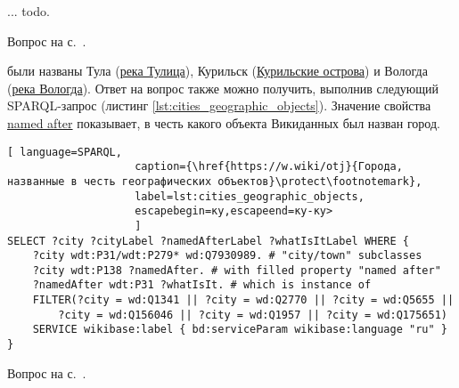 \begin{task}
    \label{answer:global-vars-pros-cons}
     ... todo. 

    \small{Вопрос на с.~\pageref{fig:block:proc:swap:colors}.}
\end{task}

\begin{task}
    \label{answer:cities_geographic_objects}
     были названы Тула (\href{https://w.wiki/oLJ}{река Тулица}), Курильск (\href{https://w.wiki/oLH}{Курильские острова}) и Вологда (\href{https://w.wiki/oLG}{река Вологда}). Ответ на вопрос также можно получить, выполнив следующий SPARQL-запрос (листинг \ref{lst:cities_geographic_objects}). Значение свойства \href{https://www.wikidata.org/wiki/Property:P138}{named after} показывает, в честь какого объекта Викиданных был назван город.
    
    
    \begin{lstlisting}[ language=SPARQL, 
                    caption={\href{https://w.wiki/otj}{Города, названные в честь географических объектов}\protect\footnotemark},
                    label=lst:cities_geographic_objects, 
                    escapebegin=ку,escapeend=ку-ку>
                    ]
SELECT ?city ?cityLabel ?namedAfterLabel ?whatIsItLabel WHERE {
	?city wdt:P31/wdt:P279* wd:Q7930989. # "city/town" subclasses
	?city wdt:P138 ?namedAfter. # with filled property "named after"
	?namedAfter wdt:P31 ?whatIsIt. # which is instance of
	FILTER(?city = wd:Q1341 || ?city = wd:Q2770 || ?city = wd:Q5655 ||
		?city = wd:Q156046 || ?city = wd:Q1957 || ?city = wd:Q175651)
	SERVICE wikibase:label { bd:serviceParam wikibase:language "ru" }
}
    \end{lstlisting}
    \small{Вопрос на с.~\pageref{lst:population_town}.}
\end{task}

